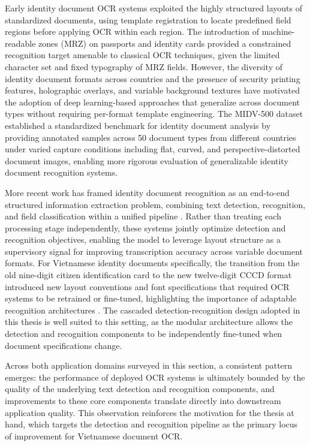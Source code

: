 Early identity document OCR systems exploited the highly structured layouts of standardized documents, using template registration to locate predefined field regions before applying OCR within each region. The introduction of machine-readable zones (MRZ) on passports and identity cards provided a constrained recognition target amenable to classical OCR techniques, given the limited character set and fixed typography of MRZ fields. However, the diversity of identity document formats across countries and the presence of security printing features, holographic overlays, and variable background textures have motivated the adoption of deep learning-based approaches that generalize across document types without requiring per-format template engineering. The MIDV-500 dataset \cite{Bulatov2019} established a standardized benchmark for identity document analysis by providing annotated samples across 50 document types from different countries under varied capture conditions including flat, curved, and perspective-distorted document images, enabling more rigorous evaluation of generalizable identity document recognition systems.

More recent work has framed identity document recognition as an end-to-end structured information extraction problem, combining text detection, recognition, and field classification within a unified pipeline \cite{Tran2019}. Rather than treating each processing stage independently, these systems jointly optimize detection and recognition objectives, enabling the model to leverage layout structure as a supervisory signal for improving transcription accuracy across variable document formats. For Vietnamese identity documents specifically, the transition from the old nine-digit citizen identification card to the new twelve-digit CCCD format introduced new layout conventions and font specifications that required OCR systems to be retrained or fine-tuned, highlighting the importance of adaptable recognition architectures \cite{Nguyen2022}. The cascaded detection-recognition design adopted in this thesis is well suited to this setting, as the modular architecture allows the detection and recognition components to be independently fine-tuned when document specifications change.

Across both application domains surveyed in this section, a consistent pattern emerges: the performance of deployed OCR systems is ultimately bounded by the quality of the underlying text detection and recognition components, and improvements to these core components translate directly into downstream application quality. This observation reinforces the motivation for the thesis at hand, which targets the detection and recognition pipeline as the primary locus of improvement for Vietnamese document OCR.
